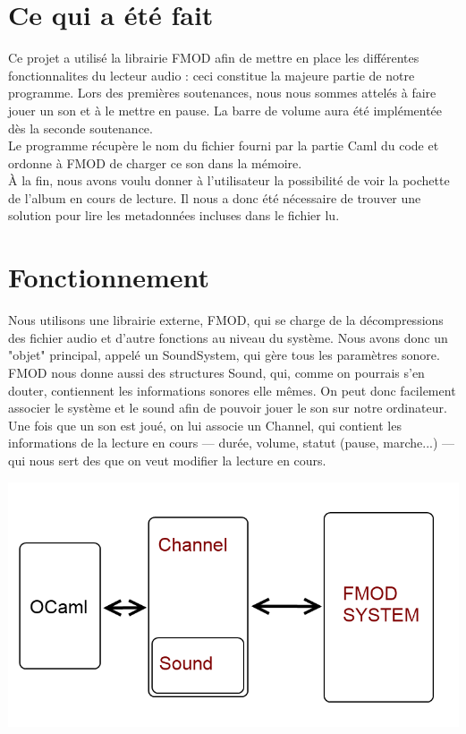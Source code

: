\documentclass[12pt,a4paper]{report}
\begin{document}
\section{Ce qui a été fait}

Ce projet a utilisé la librairie FMOD afin de mettre en place les différentes fonctionnalites du lecteur audio : ceci constitue la majeure partie de notre programme. Lors des premières soutenances, nous nous sommes attelés à faire jouer un son et à le mettre en pause. La barre de volume aura été implémentée dès la seconde soutenance.\\

Le programme récupère le nom du fichier fourni par la partie Caml du code et ordonne à FMOD de charger ce son dans la mémoire.\\

À la fin, nous avons voulu donner à l'utilisateur la possibilité de voir la pochette de l'album en cours de lecture. Il nous a donc été nécessaire de trouver une solution pour lire les metadonnées incluses dans le fichier lu.\\

\section{Fonctionnement}

Nous utilisons une librairie externe, FMOD, qui se charge de la décompressions des fichier audio et d'autre fonctions au niveau du système. Nous avons donc un "objet" principal, appelé un SoundSystem, qui gère tous les paramètres sonore.\\
FMOD nous donne aussi des structures Sound, qui, comme on pourrais s'en douter, contiennent les informations sonores elle mêmes. On peut donc facilement associer le système et le sound afin de pouvoir jouer le son sur notre ordinateur.\\

Une fois que un son est joué, on lui associe un Channel, qui contient les informations de la lecture en cours --- durée, volume, statut (pause, marche...) --- qui nous sert des que on veut modifier la lecture en cours.

\begin{center}
\includegraphics[scale=0.5]{fmod.png}
\end{center}
\end{document}
